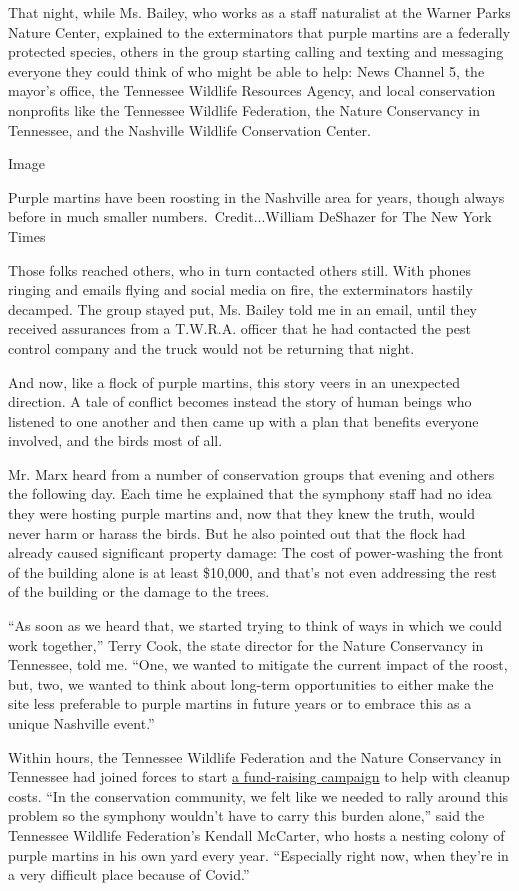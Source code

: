 That night, while Ms. Bailey, who works as a staff naturalist at the
Warner Parks Nature Center, explained to the exterminators that purple
martins are a federally protected species, others in the group starting
calling and texting and messaging everyone they could think of who might
be able to help: News Channel 5, the mayor's office, the Tennessee
Wildlife Resources Agency, and local conservation nonprofits like the
Tennessee Wildlife Federation, the Nature Conservancy in Tennessee, and
the Nashville Wildlife Conservation Center.

Image

Purple martins have been roosting in the Nashville area for years,
though always before in much smaller numbers.~Credit...William DeShazer
for The New York Times

Those folks reached others, who in turn contacted others still. With
phones ringing and emails flying and social media on fire, the
exterminators hastily decamped. The group stayed put, Ms. Bailey told me
in an email, until they received assurances from a T.W.R.A. officer that
he had contacted the pest control company and the truck would not be
returning that night.

And now, like a flock of purple martins, this story veers in an
unexpected direction. A tale of conflict becomes instead the story of
human beings who listened to one another and then came up with a plan
that benefits everyone involved, and the birds most of all.

Mr. Marx heard from a number of conservation groups that evening and
others the following day. Each time he explained that the symphony staff
had no idea they were hosting purple martins and, now that they knew the
truth, would never harm or harass the birds. But he also pointed out
that the flock had already caused significant property damage: The cost
of power-washing the front of the building alone is at least \$10,000,
and that's not even addressing the rest of the building or the damage to
the trees.

``As soon as we heard that, we started trying to think of ways in which
we could work together,'' Terry Cook, the state director for the Nature
Conservancy in Tennessee, told me. ``One, we wanted to mitigate the
current impact of the roost, but, two, we wanted to think about
long-term opportunities to either make the site less preferable to
purple martins in future years or to embrace this as a unique Nashville
event.''

Within hours, the Tennessee Wildlife Federation and the Nature
Conservancy in Tennessee had joined forces to start
\href{https://act.tnwf.org/a/purple-martins}{a fund-raising campaign} to
help with cleanup costs. ``In the conservation community, we felt like
we needed to rally around this problem so the symphony wouldn't have to
carry this burden alone,'' said the Tennessee Wildlife Federation's
Kendall McCarter, who hosts a nesting colony of purple martins in his
own yard every year. ``Especially right now, when they're in a very
difficult place because of Covid.''

